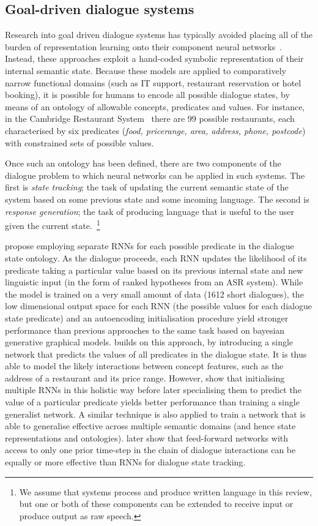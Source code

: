 \documentclass[11pt,letterpaper]{article}
\begin{document}
\subsection{Goal-driven dialogue systems}
Research into goal driven dialogue systems has typically avoided placing all of the burden of representation learning onto their component neural networks~\cite{henderson2014word,mrkvsic2015multi,wen2015stochastic,wen2015semantically}. Instead, these approaches exploit a hand-coded symbolic representation of their internal semantic state. Because these models are applied to comparatively narrow functional domains (such as IT support, restaurant reservation or hotel booking), it is possible for humans to encode all possible dialogue states, by means of an ontology of allowable concepts, predicates and values. For instance, in the Cambridge Restaurant System~\cite{wen2016network} there are 99 possible restaurants, each characterised by six predicates (\emph{food, pricerange, area, address, phone, postcode}) with constrained sets of possible values. 

Once such an ontology has been defined, there are two components of the dialogue problem to which neural networks can be applied in such systems. The first is \emph{state tracking}; the task of updating the current semantic state of the system based on some previous state and some incoming language. The second is \emph{response generation}; the task of producing language that is useful to the user given the current state.~\footnote{We assume that systems process and produce written language in this review, but one or both of these components can be extended to receive input or produce output as raw speech.}

 propose employing separate RNNs for each possible predicate in the dialogue state ontology. As the dialogue proceeds, each RNN updates the likelihood of its predicate taking a particular value based on its previous internal state and new linguistic input (in the form of ranked hypotheses from an ASR system). While the model is trained on a very small amount of data (1612 short dialogues), the low dimensional output space for each RNN (the possible values for each dialogue state predicate) and an autoencoding initialisation procedure yield stronger performance than previous approaches to the same task based on bayesian generative graphical models.  builds on this approach, by introducing a single network that predicts the values of all predicates in the dialogue state. It is thus able to model the likely interactions between concept features, such as the address of a restaurant and its price range. However,  show that initialising multiple RNNs in this holistic way before later specialising them to predict the value of a particular predicate yields better performance than training a single generalist network. A similar technique is also applied to train a network that is able to generalise effective across multiple semantic domains (and hence state representations and ontologies).  later show that feed-forward networks with access to only one prior time-step in the chain of dialogue interactions can be equally or more effective than RNNs for dialogue state tracking. 
\end{document}
